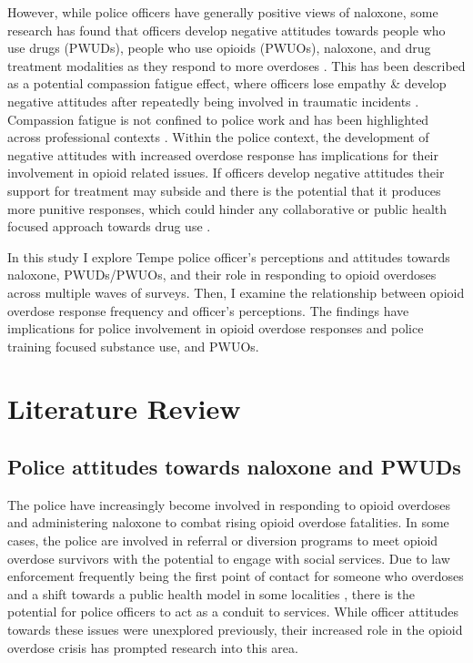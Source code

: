 However, while police officers have generally positive views of naloxone, some research has found that officers develop negative attitudes towards people who use drugs (PWUDs), people who use opioids (PWUOs), naloxone, and drug treatment modalities as they respond to more overdoses \parencite{carroll_knowledge_2020, murphy_police_2020, murphy_police_2021}. This has been described as a potential compassion fatigue effect, where officers lose empathy \& develop negative attitudes after repeatedly being involved in traumatic incidents \parencite{figley_compassion_1995, figley_treating_2002}. Compassion fatigue is not confined to police work and has been highlighted across professional contexts \parencite{adams_compassion_2006}. Within the police context, the development of negative attitudes with increased overdose response has implications for their involvement in opioid related issues. If officers develop negative attitudes their support for treatment may subside and there is the potential that it produces more punitive responses, which could hinder any collaborative or public health focused approach towards drug use \parencite{winstanley_bell_2020}.

In this study I explore Tempe police officer's perceptions and attitudes towards naloxone, PWUDs/PWUOs, and their role in responding to opioid overdoses across multiple waves of surveys. Then, I examine the relationship between opioid overdose response frequency and officer's perceptions. The findings have implications for police involvement in opioid overdose responses and police training focused substance use, and PWUOs.


\section{Literature Review}
\subsection{Police attitudes towards naloxone and PWUDs}
The police have increasingly become involved in responding to opioid overdoses and administering naloxone to combat rising opioid overdose fatalities. In some cases, the police are involved in referral or diversion programs to meet opioid overdose survivors with the potential to engage with social services. Due to law enforcement frequently being the first point of contact for someone who overdoses and a shift towards a public health model in some localities \parencite{beletsky_police_2011, silverman_harmonizing_2012}, there is the potential for police officers to act as a conduit to services. While officer attitudes towards these issues were unexplored previously, their increased role in the opioid overdose crisis has prompted research into this area.

